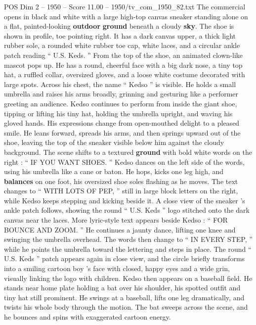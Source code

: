 \begin{textsample}{POS Dim 2 – 1950 – Score 11.00 – 1950/tv\_com\_1950\_82.txt}  \label{ex:f2_pos_089}
The commercial opens in black and white with a large high-top canvas sneaker standing alone on a flat, painted-looking \textbf{outdoor} \textbf{ground} beneath a cloudy \textbf{sky}.
The shoe is shown in profile, toe pointing right.
It has a dark canvas upper, a thick light rubber sole, a rounded white rubber toe cap, white laces, and a circular ankle patch reading “ U.S.
Keds. ” From the top of the shoe, an animated clown-like mascot pops up.
He has a round, cheerful face with a big dark nose, a tiny top hat, a ruffled collar, oversized gloves, and a loose white costume decorated with large spots.
Across his chest, the name “ Kedso ” is visible.
He holds a small umbrella and raises his arms broadly, grinning and gesturing like a performer greeting an audience.
Kedso continues to perform from inside the giant shoe, tipping or lifting his tiny hat, holding the umbrella upright, and waving his gloved hands.
His expressions change from open-mouthed delight to a pleased smile.
He leans forward, spreads his arms, and then springs upward out of the shoe, leaving the top of the sneaker visible below him against the cloudy background.
The scene shifts to a textured \textbf{ground} with bold white words on the right : “ IF YOU WANT SHOES. ” Kedso dances on the left side of the words, using his umbrella like a cane or baton.
He hops, kicks one leg high, and \textbf{balances} on one foot, his oversized shoe soles flashing as he moves.
The text changes to “ WITH LOTS OF PEP, ” still in large block letters on the right, while Kedso keeps stepping and kicking beside it.
A close view of the sneaker ’s ankle patch follows, showing the round “ U.S.
Keds ” logo stitched onto the dark canvas near the laces.
More lyric-style text appears beside Kedso : “ FOR BOUNCE AND ZOOM. ” He continues a jaunty dance, lifting one knee and swinging the umbrella overhead.
The words then change to “ IN EVERY STEP, ” while he points the umbrella toward the lettering and steps in place.
The round “ U.S.
Keds ” patch appears again in close view, and the circle briefly transforms into a smiling cartoon boy ’s face with closed, happy eyes and a wide grin, visually linking the logo with children.
Kedso then appears on a baseball field.
He stands near home plate holding a bat over his shoulder, his spotted outfit and tiny hat still prominent.
He swings at a baseball, lifts one leg dramatically, and twists his whole body through the motion.
The bat sweeps across the scene, and he bounces and spins with exaggerated cartoon energy.

\end{textsample}

